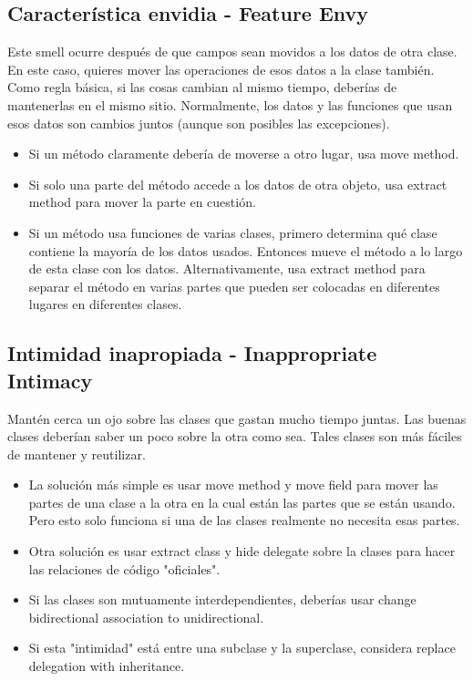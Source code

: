 \documentclass[11pt,a4paper,oneside]{book}
\begin{document}
\subsection{Característica envidia - Feature Envy}
\label{featureenvy}
Este smell ocurre después de que campos sean movidos a los datos de otra clase. En este caso, quieres mover las operaciones de esos datos a la clase también.
\newline
Como regla básica, si las cosas cambian al mismo tiempo, deberías de mantenerlas en el mismo sitio. Normalmente, los datos y las funciones que usan esos datos son cambios juntos (aunque son posibles las excepciones).
\begin{itemize}
    \item Si un método claramente debería de moverse a otro lugar, usa move method.
    \item Si solo una parte del método accede a los datos de otra objeto, usa extract method para mover la parte en cuestión.
    \item Si un método usa funciones de varias clases, primero determina qué clase contiene la mayoría de los datos usados. Entonces mueve el método a lo largo de esta clase con los datos. Alternativamente, usa extract method para separar el método en varias partes que pueden ser colocadas en diferentes lugares en diferentes clases.
\end{itemize}

\subsection{Intimidad inapropiada - Inappropriate Intimacy}
\label{inappropriateintimacy}
Mantén cerca un ojo sobre las clases que gastan mucho tiempo juntas. Las buenas clases deberían saber un poco sobre la otra como sea. Tales clases son más fáciles de mantener y reutilizar.
\newline
\begin{itemize}
    \item La solución más simple es usar move method y move field para mover las partes de una clase a la otra en la cual están las partes que se están usando. Pero esto solo funciona si una de las clases realmente no necesita esas partes.
    \item Otra solución es usar extract class y hide delegate sobre la clases para hacer las relaciones de código "oficiales".
    \item Si las clases son mutuamente interdependientes, deberías usar change bidirectional association to unidirectional.
    \item Si esta "intimidad" está entre una subclase y la superclase, considera replace delegation with inheritance.
\end{itemize}
    
\end{document}
